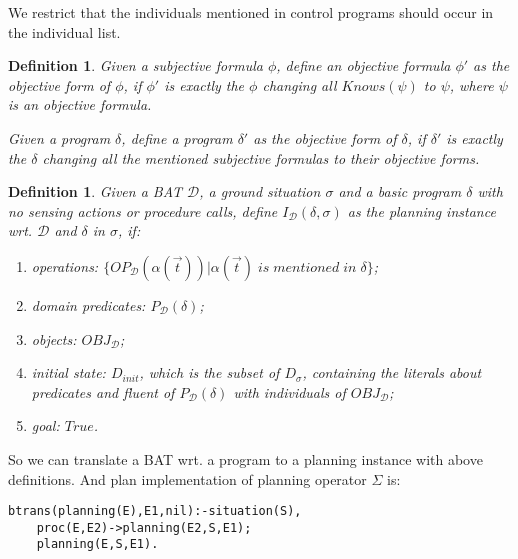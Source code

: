 \documentclass[letterpaper]{article}
\newtheorem{DEFINITION}[theorem]{Definition}
\newenvironment{definition}{\begin{DEFINITION} \rm }
                            {\end{DEFINITION}}
\begin{document}
We restrict that the individuals mentioned in control programs should occur in the individual list.

\begin{definition}
Given a subjective formula $\phi$, define an objective formula $\phi'$ as the \emph{objective form of $\phi$}, if $\phi'$ is exactly the $\phi$ changing all $Knows(\psi)$ to $\psi$, where $\psi$ is an objective formula.

Given a program $\delta$, define a program $\delta'$ as the \emph{objective form of $\delta$}, if $\delta'$ is exactly the $\delta$ changing all the mentioned subjective formulas to their objective forms.
\end{definition}

\begin{definition}
Given a BAT $\mathcal{D}$, a ground situation $\sigma$ and a basic program $\delta$ with no sensing actions or procedure calls, define $I_{\mathcal{D}}(\delta, \sigma)$ as the planning instance wrt. $\mathcal{D}$ and $\delta$ in $\sigma$, if:
\begin{enumerate}
  \item operations: $\{OP_{\mathcal{D}} (\alpha(\vec{t})) | \alpha(\vec{t})\; is\; mentioned\; in\; \delta\}$;
  \item domain predicates: $P_{\mathcal{D}}(\delta)$;
  \item objects: $OBJ_{\mathcal{D}}$;
  \item initial state: $D_{init}$, which is the subset of $D_{\sigma}$, containing the literals about predicates and fluent of $P_{\mathcal{D}}(\delta)$ with individuals of $OBJ_{\mathcal{D}}$;
  \item goal: $True$.
\end{enumerate}
\end{definition}

So we can translate a BAT wrt. a program to a planning instance with above definitions.
And plan implementation of planning operator $\Sigma$ is:

\begin{verbatim}
btrans(planning(E),E1,nil):-situation(S),
    proc(E,E2)->planning(E2,S,E1);
    planning(E,S,E1).
\end{verbatim}
\end{document}
